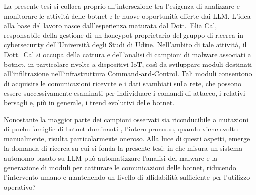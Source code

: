 La presente tesi si colloca proprio all'intersezione tra l'esigenza di analizzare e monitorare le attività delle botnet e le nuove opportunità offerte dai LLM. L'idea alla base del lavoro nasce dall'esperienza maturata dal Dott.\ Elia Cal, responsabile della gestione di un honeypot proprietario del gruppo di ricerca in cybersecurity dell'Università degli Studi di Udine. Nell'ambito di tale attività, il Dott.\ Cal si occupa della cattura e dell'analisi di campioni di malware associati a botnet, in particolare rivolte a dispositivi IoT, così da sviluppare moduli destinati all'infiltrazione \cite{caballero2009dispatcher} nell'infrastruttura Command-and-Control. Tali moduli consentono di acquisire le comunicazioni ricevute e i dati scambiati sulla rete, che possono essere successivamente esaminati per individuare i comandi di attacco, i relativi bersagli e, più in generale, i trend evolutivi delle botnet.




Nonostante la maggior parte dei campioni osservati sia riconducibile a mutazioni di poche famiglie di botnet dominanti \cite{hojun2024variant}, l'intero processo, quando viene svolto manualmente, risulta particolarmente oneroso. Alla luce di questi aspetti, emerge la domanda di ricerca su cui si fonda la presente tesi: in che misura un sistema autonomo basato su LLM può automatizzare l'analisi del malware e la generazione di moduli per catturare le comunicazioni delle botnet, riducendo l'intervento umano e mantenendo un livello di affidabilità sufficiente per l'utilizzo operativo?

